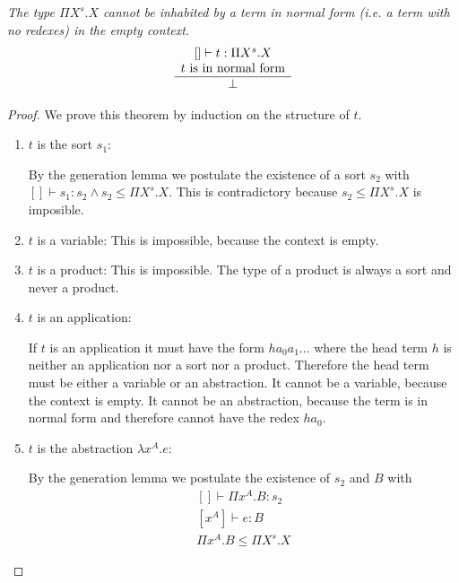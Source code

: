\begin{theorem}
    \emph{The type $\Pi X^s. X$ cannot be inhabited by a term in normal form
    (i.e. a term with no redexes) in the empty context.}
    $$
    \begin{array}{c} 
        [] \vdash t: \Pi X^s. X
        \\
        t \text{ is in normal form}
     \\ \hline 
        \perp
    \end{array}
    $$

    \begin{proof}
        We prove this theorem by induction on the structure of $t$.
        \begin{enumerate}
        \item $t$ is the sort $s_1$:

            By the generation lemma we postulate the existence of a sort $s_2$
                with $[] \vdash s_1: s_2 \land s_2 \le \Pi X^s. X$. This is
                contradictory because $s_2 \le \Pi X^s.X$ is imposible.

        \item $t$ is a variable:
            This is impossible, because the context is empty.

        \item $t$ is a product:
            This is impossible. The type of a product is always a sort and never
                a product.

        \item $t$ is an application:

            If $t$ is an application it must have the form $h a_0 a_1 \ldots$
                where the head term $h$ is neither an application nor a sort nor
                a product. Therefore the head term must be either a variable or
                an abstraction. It cannot be a variable, because the context is
                empty. It cannot be an abstraction, because the term is in
                normal form and therefore cannot have the redex $h a_0$.

        \item $t$ is the abstraction $\lambda x^A. e$:

            By the generation lemma we postulate the existence of $s_2$ and $B$
                with
                $$
                \begin{array}{l}
                    [] \vdash \Pi x^A. B: s_2
                    \\
                    \text{$[x^A]$} \vdash e: B
                    \\
                    \Pi x^A. B \le \Pi X^s. X
                \end{array}
                $$


\end{enumerate}
\end{proof}
\end{theorem}
